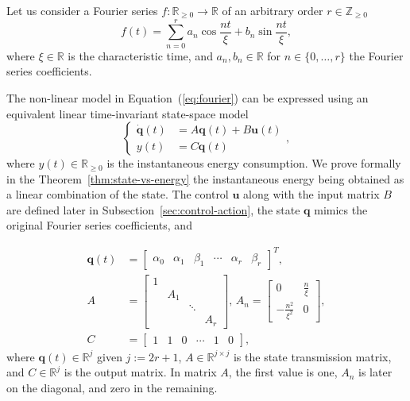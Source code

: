 \documentclass[letterpaper,10pt,conference]{ieeeconf}
\begin{document}
Let us consider a Fourier series $f:\mathbb{R}_{\geq 0}\rightarrow\mathbb{R}$ of an arbitrary order $r\in\mathbb{Z}_{\geq 0}$
\begin{equation}\label{eq:fourier}
  f(t)=\sum_{n=0}^{r}{a_n\cos{\frac{nt}{\xi}}+b_n\sin{\frac{nt}{\xi}}},
\end{equation}
where $\xi\in\mathbb{R}$ is the characteristic time, and $a_n, b_n\in\mathbb{R}$ for $n\in\{0,\dotsc,r\}$ the Fourier series coefficients.

The non-linear model in Equation~(\ref{eq:fourier}) can be expressed using an equivalent linear time-invariant state-space model
\begin{equation}\label{eq:state-perf}\begin{cases}
  \dot{\mathbf{q}}(t)&=A\mathbf{q}(t)+B\mathbf{u}(t)\\%
  y(t)&=C\mathbf{q}(t)%
\end{cases},\end{equation}
where $y(t)\in\mathbb{R}_{\geq 0}$ is the instantaneous energy consumption. We prove formally in the Theorem~\ref{thm:state-vs-energy} the instantaneous energy being obtained as a linear combination of the state. The control $\mathbf{u}$ along with the input matrix $B$ are defined later in Subsection~\ref{sec:control-action}, the state $\mathbf{q}$ mimics the original Fourier series coefficients, and

\begin{equation}\label{eq:state-details}\begin{split}
  \mathbf{q}(t)&=\left[\begin{array}{cccccc}
    \alpha_0 & \alpha_1 & \beta_1 & \cdots & \alpha_r & \beta_r
  \end{array}\right]^T,\\
  A&=\left[\begin{array}{cccc}
    1&    &       &  \\
     & A_1&       &  \\
     &    & \ddots&  \\
     &    &       & A_r 
  \end{array}\right],\,A_n=\begin{bmatrix}0 & \frac{n}{\xi} \\ -\frac{n^2}{\xi^2} & 0\end{bmatrix},\\
  C&=\left[\begin{array}{cccccc}
    1 & 1 & 0 & \cdots & 1 & 0
  \end{array}\right],
\end{split}\end{equation}
where $\mathbf{q}(t)\in\mathbb{R}^j$ given $j:=2r+1$, $A\in\mathbb{R}^{j\times j}$ is the state transmission matrix, and $C\in\mathbb{R}^j$ is the output matrix. In matrix $A$, the first value is one, $A_n$ is later on the diagonal, and zero in the remaining.
\end{document}
